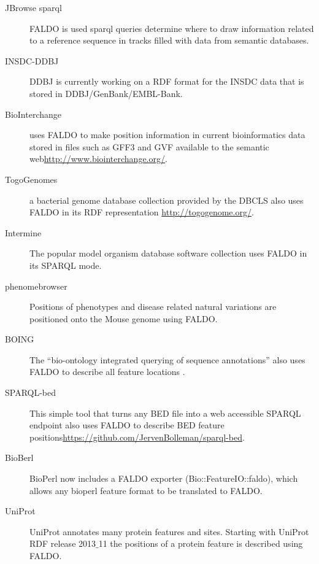 \begin{description}
\item[JBrowse sparql] FALDO is used sparql queries determine where to draw information related to a reference sequence in tracks filled with data from semantic databases. 
\item[INSDC-DDBJ] DDBJ is currently working on a RDF format for the INSDC data that is stored in DDBJ/GenBank/EMBL-Bank.
\item[BioInterchange] uses FALDO to make position information in current bioinformatics data stored in files such as GFF3 and GVF available to the semantic web\url{http://www.biointerchange.org/}.
\item[TogoGenomes] a bacterial genome database collection provided by the DBCLS also uses FALDO in its RDF representation \url{http://togogenome.org/}.
\item[Intermine] The popular model organism database software collection uses FALDO in its SPARQL mode.
\item[phenomebrowser] Positions of phenotypes and disease related natural variations are positioned onto the Mouse genome using FALDO.
\item[BOING] The ``bio-ontology integrated querying of sequence annotations'' also uses FALDO to describe all feature locations \cite{BOING}.
\item[SPARQL-bed] This simple tool that turns any BED file into a web accessible SPARQL endpoint also uses FALDO to describe BED feature positions\url{https://github.com/JervenBolleman/sparql-bed}.
\item[BioBerl] BioPerl\cite{BioPerl2002} now includes a FALDO exporter (Bio::FeatureIO::faldo), which allows any bioperl feature format to be translated to FALDO.
\item[UniProt] UniProt annotates many protein features and sites. Starting with UniProt RDF release 2013$\_$11 the positions of a protein feature is described using FALDO.
\end{description}



